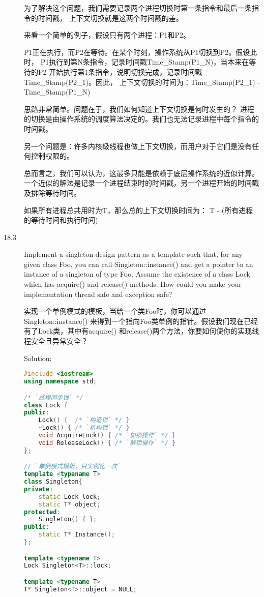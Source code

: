 \begin{description}
为了解决这个问题，我们需要记录两个进程切换时第一条指令和最后一条指令的时间戳， 上下文切换就是这两个时间戳的差。

来看一个简单的例子，假设只有两个进程：P1和P2。

P1正在执行，而P2在等待。在某个时刻，操作系统从P1切换到P2。假设此时， P1执行到第N条指令，记录时间戳Time\_Stamp(P1\_N)，当本来在等待的P2 开始执行第1条指令，说明切换完成，记录时间戳Time\_Stamp(P2\_1)。因此， 上下文切换的时间为：Time\_Stamp(P2\_1) - Time\_Stamp(P1\_N)

思路非常简单。问题在于，我们如何知道上下文切换是何时发生的？ 进程的切换是由操作系统的调度算法决定的。我们也无法记录进程中每个指令的时间戳。

另一个问题是：许多内核级线程也做上下文切换，而用户对于它们是没有任何控制权限的。

总而言之，我们可以认为，这最多只能是依赖于底层操作系统的近似计算。 一个近似的解法是记录一个进程结束时的时间戳，另一个进程开始的时间戳及排除等待时间。

如果所有进程总共用时为T，那么总的上下文切换时间为： T - (所有进程的等待时间和执行时间)


\item[18.3] Implement a singleton design pattern as a template such that, for any given class Foo, you can call Singleton::instance() and get a pointer to an instance of a singleton of type Foo. Assume the existence of a class Lock which has acquire() and release() methods. How could you make your implementation thread safe and exception safe?

实现一个单例模式的模板，当给一个类Foo时，你可以通过Singleton::instance() 来得到一个指向Foo类单例的指针。假设我们现在已经有了Lock类，其中有acquire() 和release()两个方法，你要如何使你的实现线程安全且异常安全？

Solution: 
\begin{lstlisting}[language=C++]
#include <iostream>
using namespace std;

/* `线程同步锁` */
class Lock {
public:
    Lock() {  /* `构造锁` */ }
    ~Lock() { /* `析构锁` */ }
    void AcquireLock() { /* `加锁操作` */ }
    void ReleaseLock() { /* `解锁操作` */ }
};

// `单例模式模板，只实例化一次`
template <typename T>
class Singleton{
private:
    static Lock lock;
    static T* object;
protected:
    Singleton() { };
public:
    static T* Instance();
};

template <typename T>
Lock Singleton<T>::lock;

template <typename T>
T* Singleton<T>::object = NULL;


\end{lstlisting}
\end{description}
